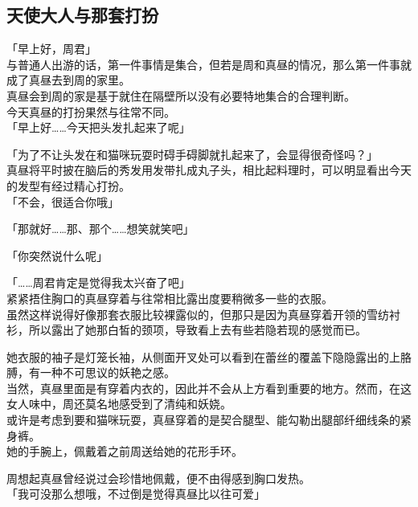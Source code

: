 \subsection{天使大人与那套打扮}

「早上好，周君」\\

与普通人出游的话，第一件事情是集合，但若是周和真昼的情况，那么第一件事就成了真昼去到周的家里。\\

真昼会到周的家是基于就住在隔壁所以没有必要特地集合的合理判断。\\

今天真昼的打扮果然与往常不同。\\

「早上好……今天把头发扎起来了呢」

「为了不让头发在和猫咪玩耍时碍手碍脚就扎起来了，会显得很奇怪吗？」\\

真昼将平时披在脑后的秀发用发带扎成丸子头，相比起料理时，可以明显看出今天的发型有经过精心打扮。\\

「不会，很适合你哦」

「那就好……那、那个……想笑就笑吧」

「你突然说什么呢」

「……周君肯定是觉得我太兴奋了吧」\\

紧紧捂住胸口的真昼穿着与往常相比露出度要稍微多一些的衣服。\\

虽然这样说得好像那套衣服比较裸露似的，但那只是因为真昼穿着开领的雪纺衬衫，所以露出了她那白皙的颈项，导致看上去有些若隐若现的感觉而已。

她衣服的袖子是灯笼长袖，从侧面开叉处可以看到在蕾丝的覆盖下隐隐露出的上胳膊，有一种不可思议的妖艳之感。\\

当然，真昼里面是有穿着内衣的，因此并不会从上方看到重要的地方。然而，在这女人味中，周还莫名地感受到了清纯和妖娆。\\

或许是考虑到要和猫咪玩耍，真昼穿着的是契合腿型、能勾勒出腿部纤细线条的紧身裤。\\

她的手腕上，佩戴着之前周送给她的花形手环。

周想起真昼曾经说过会珍惜地佩戴，便不由得感到胸口发热。\\

「我可没那么想哦，不过倒是觉得真昼比以往可爱」

